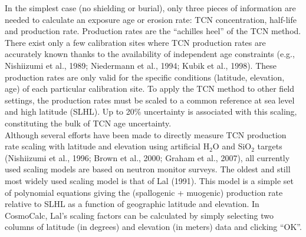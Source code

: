 \documentclass{article}
\begin{document}
In the  simplest case (no shielding  or burial), only  three pieces of
information are needed  to calculate an exposure age  or erosion rate:
TCN concentration, half-life and production rate. Production rates are
the  ``achilles heel''  of the  TCN method.   There exist  only  a few
calibration  sites where  TCN  production rates  are accurately  known
thanks  to  the availability  of  independent  age constraints  (e.g.,
Nishiizumi et al., 1989; Niedermann et al., 1994; Kubik et al., 1998).
These  production rates  are only  valid for  the  specific conditions
(latitude,  elevation, age)  of each  particular calibration  site. To
apply the  TCN method  to other field  settings, the  production rates
must be  scaled to a common  reference at sea level  and high latitude
(SLHL).   Up to  20\%  uncertainty is  associated  with this  scaling,
constituting the bulk of TCN age uncertainty.
\\

Although  several  efforts have  been  made  to  directly measure  TCN
production rate  scaling with latitude and  elevation using artificial
H$_2$O and  SiO$_2$ targets  (Nishiizumi et al.,  1996; Brown  et al.,
2000;  Graham et  al., 2007),  all currently  used scaling  models are
based on  neutron monitor surveys.   The oldest and still  most widely
used scaling model is that of  Lal (1991).  This model is a simple set
of polynomial equations giving the (spallogenic + muogenic) production
rate  relative  to SLHL  as  a  function  of geographic  latitude  and
elevation.  In  CosmoCalc, Lal's scaling factors can  be calculated by
simply selecting  two columns of  latitude (in degrees)  and elevation
(in meters) data and clicking ``OK''.
\\
\end{document}
